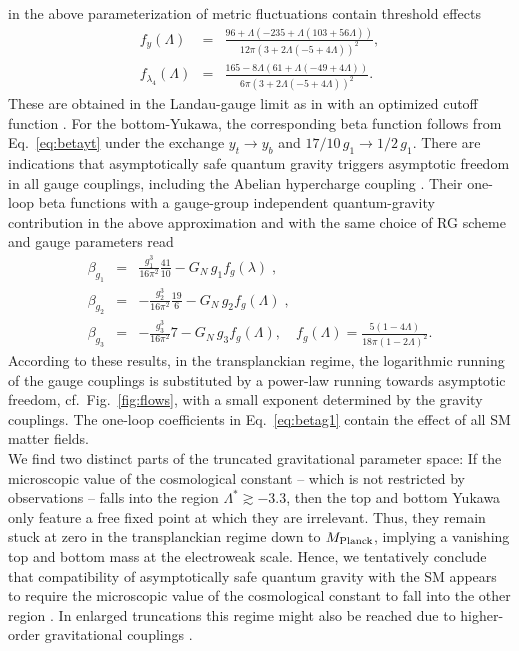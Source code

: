\documentclass[%
 reprint,
 superscriptaddress,
preprintnumbers,
nofootinbib,
 amsmath,amssymb,
 aps,
prl,
]{revtex4-1}
\newcommand{\bea}{\begin{eqnarray}}
\newcommand{\eea}{\end{eqnarray}}
\begin{document}
in the above parameterization of metric fluctuations \cite{Eichhorn:2016esv,Eichhorn:2017eht,scalar_gravity} 
contain threshold effects
\bea
f_y(\Lambda)&=&\frac{96 +\Lambda (-235 + \Lambda (103+56\Lambda))}{12\pi(3+2\Lambda(-5+4\Lambda))^2},\\
f_{\lambda_4}(\Lambda)&=& \frac{165 - 8 \Lambda \left(61+\Lambda(-49+4\Lambda) \right)}{6\pi \left(3+2\Lambda(-5+4\Lambda) \right)^2}.
\eea
These are obtained in the Landau-gauge limit as in \cite{Eichhorn:2017eht} with an optimized cutoff function \cite{Litim:2001up}.
For the bottom-Yukawa,  the
corresponding beta function 
follows from Eq.~\eqref{eq:betayt} under the exchange $y_t \rightarrow y_b$ and  $17/10\, g_1 \rightarrow 1/2\, g_1$.
There are  indications
that asymptotically safe quantum gravity triggers asymptotic freedom in all gauge couplings, including the Abelian hypercharge coupling \cite{Daum:2009dn,Folkerts:2011jz,Harst:2011zx,Christiansen:2017gtg}.
Their one-loop beta functions with a gauge-group independent quantum-gravity contribution  in the above approximation and with the same choice of RG scheme and gauge parameters read
\bea
\beta_{g_1}&=&\frac{g_1^3}{16\pi^2}\frac{41}{10} 
 - G_N\, g_1f_g(\lambda)\;,  \label{eq:betag1}\\
\beta_{g_2}&=&- \frac{g_2^3}{16\pi^2}\frac{19}{6} 
- G_N\, g_2 f_g(\Lambda)\;,\nonumber\\
\beta_{g_3}&=&- \frac{g_3^3}{16\pi^2}7
 - G_N\, g_3 f_g(\Lambda), \quad  f_{g}(\Lambda)= \frac{5(1-4\Lambda)}{18 \pi(1-2\Lambda)^2}.\nonumber
\eea
According to these results, in the transplanckian regime, the logarithmic running of the gauge couplings is substituted by a power-law running towards asymptotic freedom, cf.~Fig.~\ref{fig:flows}, with a small exponent determined by the gravity couplings. The one-loop coefficients in Eq.~\eqref{eq:betag1} contain the effect of all SM matter fields.
\\
We find two distinct parts of the truncated gravitational parameter space: If the microscopic value of the cosmological constant -- which is not restricted by observations -- falls into the region $\Lambda^{\ast} \gtrsim-3.3$, then the top and bottom Yukawa only feature a free fixed point at which they are irrelevant. Thus, they remain stuck at zero in the transplanckian regime down to $M_{\rm Planck}$, implying a vanishing top and bottom mass at the electroweak scale.
Hence, we tentatively conclude that compatibility of asymptotically safe quantum gravity with the SM appears to require the microscopic value of the cosmological constant to fall into the other region \cite{Eichhorn:2016esv,Eichhorn:2017eht}. In enlarged truncations this regime might also be reached due to higher-order gravitational couplings \cite{Eichhorn:2017eht,Hamada:2017rvn}.
\end{document}
